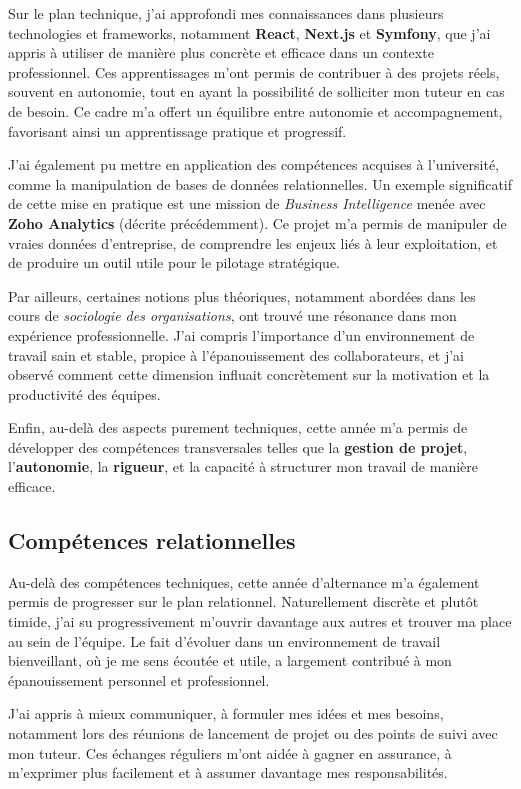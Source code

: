 Sur le plan technique, j’ai approfondi mes connaissances dans plusieurs technologies et frameworks, notamment \textbf{React}, \textbf{Next.js} et \textbf{Symfony}, que j’ai appris à utiliser de manière plus concrète et efficace dans un contexte professionnel. Ces apprentissages m’ont permis de contribuer à des projets réels, souvent en autonomie, tout en ayant la possibilité de solliciter mon tuteur en cas de besoin. Ce cadre m’a offert un équilibre entre autonomie et accompagnement, favorisant ainsi un apprentissage pratique et progressif.

J’ai également pu mettre en application des compétences acquises à l’université, comme la manipulation de bases de données relationnelles. Un exemple significatif de cette mise en pratique est une mission de \textit{Business Intelligence} menée avec \textbf{ Zoho Analytics} (décrite précédemment). Ce projet m’a permis de manipuler de vraies données d’entreprise, de comprendre les enjeux liés à leur exploitation, et de produire un outil utile pour le pilotage stratégique.

Par ailleurs, certaines notions plus théoriques, notamment abordées dans les cours de \textit{sociologie des organisations}, ont trouvé une résonance dans mon expérience professionnelle. J’ai compris l’importance d’un environnement de travail sain et stable, propice à l’épanouissement des collaborateurs, et j’ai observé comment cette dimension influait concrètement sur la motivation et la productivité des équipes.

Enfin, au-delà des aspects purement techniques, cette année m’a permis de développer des compétences transversales telles que la \textbf{gestion de projet}, l’\textbf{autonomie}, la \textbf{rigueur}, et la capacité à structurer mon travail de manière efficace.

\subsection{Compétences relationnelles}

Au-delà des compétences techniques, cette année d’alternance m’a également permis de progresser sur le plan relationnel. Naturellement discrète et plutôt timide, j’ai su progressivement m’ouvrir davantage aux autres et trouver ma place au sein de l’équipe. Le fait d’évoluer dans un environnement de travail bienveillant, où je me sens écoutée et utile, a largement contribué à mon épanouissement personnel et professionnel.

J’ai appris à mieux communiquer, à formuler mes idées et mes besoins, notamment lors des réunions de lancement de projet ou des points de suivi avec mon tuteur. Ces échanges réguliers m’ont aidée à gagner en assurance, à m’exprimer plus facilement et à assumer davantage mes responsabilités.

